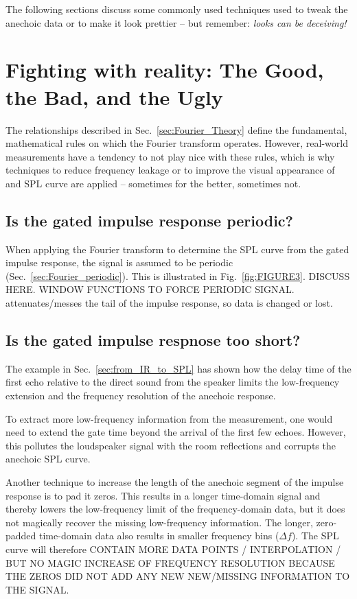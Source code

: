 \documentclass[12pt,a4paper]{article}
\providecommand{\secn}[1]{Sec.~\ref{sec:#1}}
\providecommand{\figr}[1]{Fig.~\ref{fig:#1}}
\begin{document}
The following sections discuss some commonly used techniques used to tweak the anechoic data or to make it look prettier -- but remember: \emph{looks can be deceiving!}


\section{Fighting with reality: The Good, the Bad, and the Ugly}

The relationships described in \secn{Fourier_Theory} define the fundamental, mathematical rules on which the Fourier transform operates. However, real-world measurements have a tendency to not play nice with these rules, which is why techniques to reduce frequency leakage or to improve the visual appearance of and SPL curve are applied -- sometimes for the better, sometimes not.

\subsection{Is the gated impulse response periodic?}
When applying the Fourier transform to determine the SPL curve from the gated impulse response, the signal is assumed to be periodic (\secn{Fourier_periodic}). This is illustrated in \figr{FIGURE3}.
DISCUSS HERE. WINDOW FUNCTIONS TO FORCE PERIODIC SIGNAL. attenuates/messes the tail of the impulse response, so data is changed or lost.


\subsection{Is the gated impulse respnose too short?}
The example in \secn{from_IR_to_SPL} has shown how the delay time of the first echo relative to the direct sound from the speaker limits the low-frequency extension and the frequency resolution of the anechoic response. 

To extract more low-frequency information from the measurement, one would need to extend the gate time beyond the arrival of the first few echoes. However, this pollutes the loudspeaker signal with the room reflections and corrupts the anechoic SPL curve. 

Another technique to increase the length of the anechoic segment of the impulse response is to pad it zeros. This results in a longer time-domain signal and thereby lowers the low-frequency limit of the frequency-domain data, but it does not magically recover the missing low-frequency information. The longer, zero-padded time-domain data also results in smaller frequency bins ($\Delta f$). The SPL curve will therefore CONTAIN MORE DATA POINTS / INTERPOLATION / BUT NO MAGIC INCREASE OF FREQUENCY RESOLUTION BECAUSE THE ZEROS DID NOT ADD ANY NEW NEW/MISSING INFORMATION TO THE SIGNAL.
\end{document}
